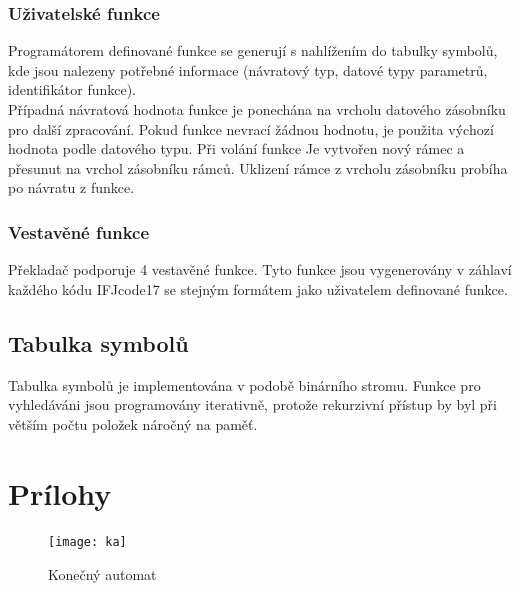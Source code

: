 \documentclass[11pt, a4paper]{article}
\begin{document}
    \subsubsection{Uživatelské funkce}
    Programátorem definované funkce se generují s nahlížením do tabulky symbolů, kde jsou nalezeny potřebné informace (návratový typ, datové typy parametrů, identifikátor funkce).\\
    \indent Případná návratová hodnota funkce je ponechána na vrcholu datového zásobníku pro další zpracování. Pokud funkce nevrací žádnou hodnotu, je použita výchozí hodnota podle datového typu.
    \indent Při volání funkce Je vytvořen nový rámec a přesunut na vrchol zásobníku rámců. Uklizení rámce z vrcholu zásobníku probíha po návratu z funkce.
        \subsubsection{Vestavěné funkce}
    Překladač podporuje 4 vestavěné funkce. Tyto funkce jsou vygenerovány v záhlaví každého kódu IFJcode17 se stejným formátem jako uživatelem definované funkce.
\subsection{Tabulka symbolů}
    Tabulka symbolů je implementována v podobě binárního stromu. Funkce pro vyhledáváni jsou programovány iterativně, protože rekurzivní přístup by byl při větším počtu položek náročný na paměť.
\section{Prílohy} 

 \begin{figure} [h]
	\begin{center}
		\texttt{[image: ka]}	
		\caption{Konečný automat}
		\label{ka}
	\end{center}
		\end{figure}	
\end{document}
